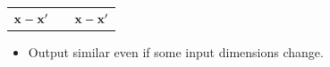 {\begin{tabular}{ccc}
 ${\bf{x}} - {\bf{x}}'$ & & ${\bf{x}} - {\bf{x}}'$
\end{tabular}

\begin{itemize}
	\item Output similar even if some input dimensions change.
\end{itemize}
}




